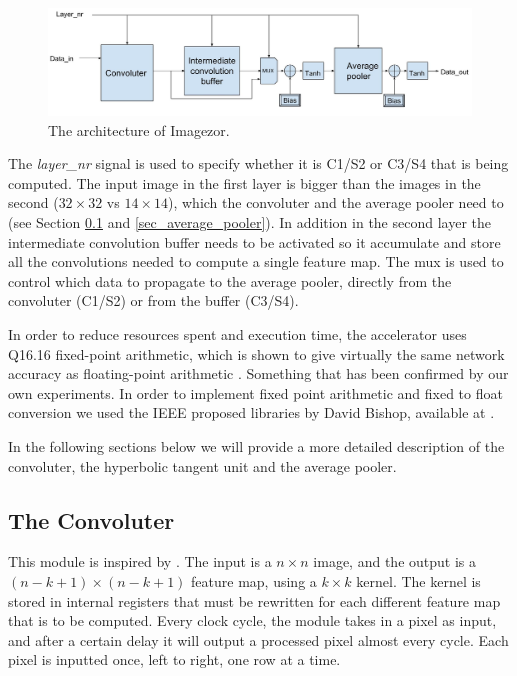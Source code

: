 \begin{figure}[h!]
	\centering
    	\includegraphics[width=1.0\textwidth]{Figures/Method/conv_layer_arch}
  	\caption{The architecture of Imagezor.}
  	\label{fig_imagezor_architecture}
\end{figure}

The \textit{layer\_nr} signal is used to specify whether it is C1/S2 or C3/S4 that is being computed. The input image in the first layer is bigger than the images in the second ($ 32 \times 32 $ vs $ 14 \times 14 $), which the convoluter and the average pooler need to  (see Section \ref{sec_convoluter} and \ref{sec_average_pooler}). In addition in the second layer the intermediate convolution buffer needs to be activated so it accumulate and store all the convolutions needed to compute a single feature map. The mux is used to control which data to propagate to the average pooler, directly from the convoluter (C1/S2) or from the buffer (C3/S4). 

In order to reduce resources spent and execution time, the accelerator uses Q16.16 fixed-point arithmetic, which is shown to give virtually the same network accuracy as floating-point arithmetic\cite{Napocensis2009} \cite{Holt1993} \cite{Chen2014}. Something that has been confirmed by our own experiments. In order to implement fixed point arithmetic and fixed to float conversion we used the IEEE proposed libraries by David Bishop, available at \cite{Bishop2015}.   

In the following sections below we will provide a more detailed description of the convoluter, the hyperbolic tangent unit and the average pooler. 


\subsection{The Convoluter} \label{sec_convoluter}

This module is inspired by \cite{Farabet2009}. The input is a $ n \times n $ image, and the output is a $ (n-k+1) \times (n-k+1) $ feature map, using a $ k \times k $ kernel. The kernel is stored in internal registers that must be rewritten for each different feature map that is to be computed. Every clock cycle, the module takes in a pixel as input, and after a certain delay it will output a processed pixel almost every cycle. Each pixel is inputted once, left to right, one row at a time. 

